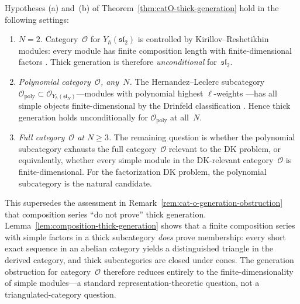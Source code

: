 \begin{remark}
\label{rem:catO-thick-generation-verification}
Hypotheses (a) and~(b) of
Theorem~\ref{thm:catO-thick-generation} hold in the following
settings:
\begin{enumerate}[label=\textup{(\roman*)}]
\item \emph{$N = 2$.}
  Category~$\mathcal{O}$ for $Y_\hbar(\mathfrak{sl}_2)$
  is controlled by Kirillov--Reshetikhin modules:
  every module has finite composition length
  with finite-dimensional factors
  \cite{ChariPressley94}.
  Thick generation is therefore
  \emph{unconditional} for~$\mathfrak{sl}_2$.
\item \emph{Polynomial category~$\mathcal{O}$, any~$N$.}
  The Hernandez--Leclerc subcategory
  $\mathcal{O}_{\mathrm{poly}} \subset
  \mathcal{O}_{Y_\hbar(\mathfrak{sl}_N)}$---modules
  with polynomial highest $\ell$-weights
  \cite{HernandezLeclerc10}---has all simple objects
  finite-dimensional by the Drinfeld classification
  \cite{Drinfeld88}.  Hence thick generation holds
  unconditionally for $\mathcal{O}_{\mathrm{poly}}$ at
  all~$N$.
\item \emph{Full category~$\mathcal{O}$ at $N \ge 3$.}
  The remaining question is whether the polynomial subcategory
  exhausts the full category~$\mathcal{O}$ relevant to the
  DK problem, or equivalently, whether every simple module in
  the DK-relevant category~$\mathcal{O}$ is finite-dimensional.
  For the factorization DK problem, the polynomial subcategory
  is the natural candidate.
\end{enumerate}

This supersedes the assessment in
Remark~\ref{rem:cat-o-generation-obstruction} that composition
series ``do not prove'' thick generation.
Lemma~\ref{lem:composition-thick-generation} shows that a
finite composition series with simple factors in a thick
subcategory \emph{does} prove membership: every short exact
sequence in an abelian category yields a distinguished triangle
in the derived category, and thick subcategories are closed under
cones.  The generation obstruction for category~$\mathcal{O}$
therefore reduces entirely to the finite-dimensionality of
simple modules---a standard representation-theoretic question,
not a triangulated-category question.
\end{remark}

